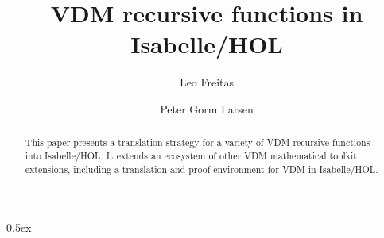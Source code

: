 \documentclass[runningheads,a4paper]{llncs}
\begin{document}
\title{VDM recursive functions in Isabelle/HOL}
\author{Leo Freitas \and Peter Gorm Larsen}

\authorrunning{ }

			
\maketitle
\setcounter{footnote}{0} 
\begin{abstract}
    This paper presents a translation strategy for a variety of VDM recursive functions into Isabelle/HOL. 
     It extends an ecosystem of other VDM mathematical toolkit extensions, including a translation and proof environment for VDM in Isabelle/HOL.
\end{abstract}



\parindent 0pt\parskip 0.5ex




 
\end{document}
